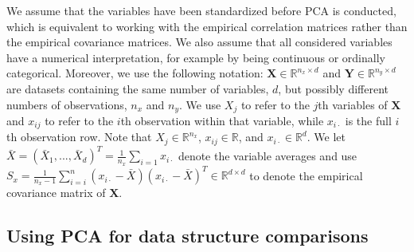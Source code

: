 \documentclass[]{interact}
\theoremstyle{plain}%
\theoremstyle{definition}
\theoremstyle{remark}
\newcommand{\RR}{\mathbb{R}}
\begin{document}
We assume that the variables have been standardized before PCA is conducted, which is equivalent to working with the empirical correlation matrices rather than the empirical covariance matrices. We also assume that all considered variables have a numerical interpretation, for example by being continuous or ordinally categorical. Moreover, we use the following notation: 
$\mathbf{X} \in \RR^{n_x \times d} $ and $\mathbf{Y} \in \RR^{n_y \times d} $ are datasets containing the same number of variables, $d$, but possibly different numbers of observations, $n_x$ and $n_y$. We use $X_j$ to refer to the $j$th variables of $\mathbf{X}$ and $x_{ij}$ to refer to the $i$th observation  within that variable, while $x_{i \cdot}$ is the full $i$th observation row. Note that $X_j \in \RR^{n_x}$, $x_{ij} \in \RR$, and $x_{i \cdot} \in \RR^d$. We let $\bar{X} = (\bar{X}_1, ... , \bar{X}_d)^T = \frac{1}{n_x} \sum_{i = 1} x_{i \cdot}$ denote the variable averages and use $S_x =  \frac{1}{n_x - 1} \sum_{i = i}^n (x_{i \cdot} - \bar{X})(x_{i \cdot} - \bar{X})^T \in \RR^{d \times d}$ to denote the empirical covariance matrix of $\mathbf{X}$. 



\subsection{Using PCA for data structure comparisons}
\end{document}
